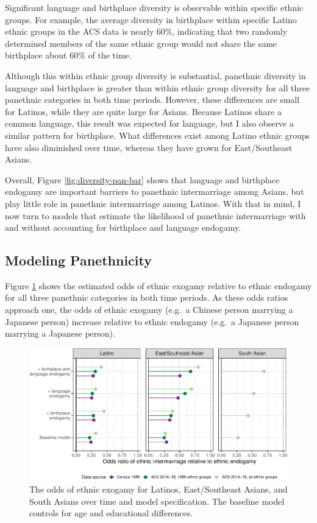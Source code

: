 \documentclass[11pt,]{article}
\begin{document}
Significant language and birthplace diversity is observable within specific ethnic groups. For example, the average diversity in birthplace within specific Latino ethnic groups in the ACS data is nearly 60\%, indicating that two randomly determined members of the same ethnic group would not share the same birthplace about 60\% of the time.

Although this within ethnic group diversity is substantial, panethnic diversity in language and birthplace is greater than within ethnic group diversity for all three panethnic categories in both time periods. However, these differences are small for Latinos, while they are quite large for Asians. Because Latinos share a common language, this result was expected for language, but I also observe a similar pattern for birthplace. What differences exist among Latino ethnic groups have also diminished over time, whereas they have grown for East/Southeast Asians.

Overall, Figure \ref{fig:diversity-pan-bar} shows that language and birthplace endogamy are important barriers to panethnic intermarriage among Asians, but play little role in panethnic intermarriage among Latinos. With that in mind, I now turn to models that estimate the likelihood of panethnic intermarriage with and without accounting for birthplace and language endogamy.

\hypertarget{modeling-panethnicity}{%
\subsection{Modeling Panethnicity}\label{modeling-panethnicity}}

Figure \ref{fig:exog-lolly} shows the estimated odds of ethnic exogamy relative to ethnic endogamy for all three panethnic categories in both time periods. As these odds ratios approach one, the odds of ethnic exogamy (e.g.~a Chinese person marrying a Japanese person) increase relative to ethnic endogamy (e.g.~a Japanese person marrying a Japanese person).

\begin{figure}
\centering
\includegraphics{main_files/figure-latex/exog-lolly-1.pdf}
\caption{\label{fig:exog-lolly}The odds of ethnic exogamy for Latinos, East/Southeast Asians, and South Asians over time and model specification. The baseline model controls for age and educational differences.}
\end{figure}
\end{document}
